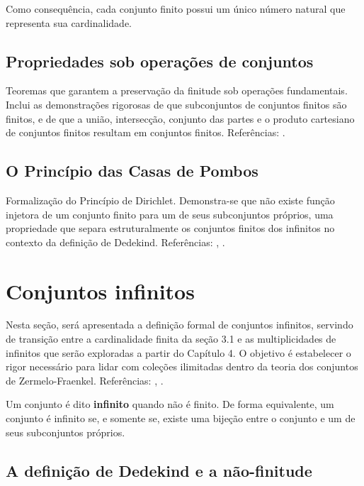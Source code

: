 Como consequência, cada conjunto finito possui um único número natural que representa sua cardinalidade.

\subsection{Propriedades sob operações de conjuntos}
\label{subsec:propriedades_operacoes_finitos}

Teoremas que garantem a preservação da finitude sob operações fundamentais. Inclui as demonstrações rigorosas de que subconjuntos de conjuntos finitos são finitos, e de que a união, intersecção, conjunto das partes e o produto cartesiano de conjuntos finitos resultam em conjuntos finitos. Referências: \cite{enderton1977}.

\subsection{O Princípio das Casas de Pombos}
\label{subsec:principio_casas_pombos}

Formalização do Princípio de Dirichlet. Demonstra-se que não existe função injetora de um conjunto finito para um de seus subconjuntos próprios, uma propriedade que separa estruturalmente os conjuntos finitos dos infinitos no contexto da definição de Dedekind. Referências: \cite{halmos2014}, \cite{suppes1972}.

\section{Conjuntos infinitos}
\label{sec:conjuntos_infinitos}

Nesta seção, será apresentada a definição formal de conjuntos infinitos, servindo de transição entre a cardinalidade finita da seção 3.1 e as multiplicidades de infinitos que serão exploradas a partir do Capítulo 4. O objetivo é estabelecer o rigor necessário para lidar com coleções ilimitadas dentro da teoria dos conjuntos de Zermelo-Fraenkel. Referências: \cite{halmos2014}, \cite{enderton1977}.

Um conjunto é dito \textbf{infinito} quando não é finito. De forma equivalente, um conjunto é infinito se, e somente se, existe uma bijeção entre o conjunto e um de seus subconjuntos próprios.

\subsection{A definição de Dedekind e a não-finitude}
\label{subsec:definicao_dedekind}

